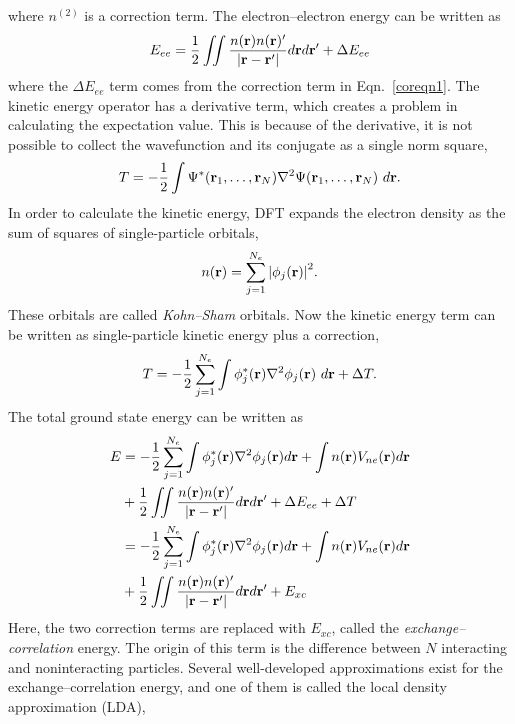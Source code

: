 where $n^{(2)}$ is a correction term. The electron--electron energy can be written as
\begin{equation}
 E_{ee} = \frac{1}{2}\iint  \frac{n(\vb{r})n(\vb{r})'}{\abs{\vb{r}-\vb{r}'}} d\vb{r}d\vb{r}' + \Delta E_{ee}
\end{equation}
where the $\Delta E_{ee}$ term comes from the correction term in Eqn.~\eqref{coreqn1}.
The kinetic energy operator has a derivative term, which creates a problem in calculating the expectation value. This is because of the derivative, it is not possible to collect the wavefunction and its conjugate as a single norm square,
\begin{equation}\label{keeqn}
T = -\frac{1}{2}\int  \Psi^{\ast}(\vb{r}_1,\dots,\vb{r}_N) \nabla^2 \Psi(\vb{r}_1,\dots,\vb{r}_N)\ d\vb{r}.
\end{equation}
In order to calculate the kinetic energy, DFT expands the electron density as the sum of squares of single-particle orbitals,
\begin{equation}
n(\vb{r}) = \sum_{j=1}^{N_e} \abs{\phi_j(\vb{r})}^2.
\end{equation}
These orbitals are called \textit{Kohn--Sham} orbitals. Now the kinetic energy term can be written as single-particle kinetic energy plus a correction,
\begin{equation}
T = -\frac{1}{2}\sum_{j=1}^{N_e} \int \phi^{\ast}_j (\vb{r})\nabla^2 \phi_j(\vb{r})\ d\vb{r}  + \Delta T.
\end{equation}
The total ground state energy can be written as
\begin{align}
\begin{split}
E   &= -\frac{1}{2}\sum_{j=1}^{N_e} \int \phi^{\ast}_j (\vb{r})\nabla^2 \phi_j(\vb{r}) d\vb{r}  + \int n(\vb{r})V_{ne}(\vb{r})d\vb{r} \\ 
	& + \frac{1}{2}\iint  \frac{n(\vb{r})n(\vb{r})'}{\abs{\vb{r}-\vb{r}'}} d\vb{r}d\vb{r}' + \Delta E_{ee} + \Delta T \\
   & =-\frac{1}{2}\sum_{j=1}^{N_e} \int \phi^{\ast}_j (\vb{r})\nabla^2 \phi_j(\vb{r}) d\vb{r}  + \int n(\vb{r})V_{ne}(\vb{r})d\vb{r} \\   & +  \frac{1}{2}\iint \frac{n(\vb{r})n(\vb{r})'}{\abs{\vb{r}-\vb{r}'}} d\vb{r}d\vb{r}'  + E_{xc}
\end{split}
\end{align}
Here, the two correction terms are replaced with $E_{xc}$, called the \textit{exchange--correlation} energy. The origin of this term is the difference between $N$ interacting and noninteracting particles. Several well-developed approximations exist for the exchange--correlation energy, and one of them is called the local density approximation (LDA),
